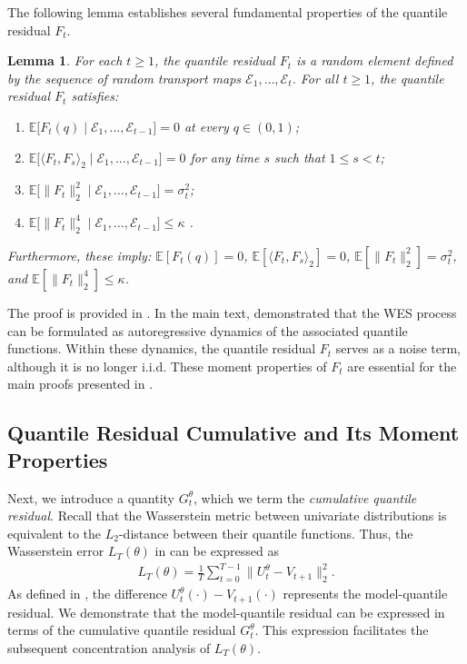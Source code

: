 \documentclass[a4paper, 11pt]{article}
\newcommand{\E}{\mathbb E}
\newcommand{\T}{\mathcal E}
\newtheorem{lemma}{Lemma}
\theoremstyle{definition}
\begin{document}
The following lemma establishes several fundamental properties of the quantile residual $F_{t}$.

\begin{lemma} \label{lem:residual_property}
	For each $t \ge 1$, the quantile residual $F_{t}$ is a random element defined by the sequence of random transport maps $\T_1, \dots, \T_{t}$.
	For all $t \ge 1$, the quantile residual $F_{t}$ satisfies:
	\begin{enumerate}
		\item $\E\big[ F_{t}(q) \mid \T_1, \dots, \T_{t-1} \big] = 0$ at every $q \in (0, 1)$;
		\item $\E\big[ \langle F_{t}, F_{s} \rangle_2 \mid \T_1, \dots, \T_{t-1} \big] = 0$ for any time $s$ such that $1 \le s < t$;
		\item $\E\big[ \| F_{t} \|_2^2 \mid \T_1, \dots, \T_{t-1} \big] = \sigma_{t}^2$;
		\item $\E\big[ \| F_{t} \|_2^4 \mid \T_1, \dots, \T_{t-1} \big] \le \kappa$ .
	\end{enumerate}
	Furthermore, these imply: $\E[ F_{t}(q) ] = 0$, $\E[ \langle F_{t}, F_{s} \rangle_2 ] = 0$, $\E[ \| F_{t} \|_2^2 ] = \sigma_{t}^2$, and $\E[ \| F_{t} \|_2^4 ] \le \kappa$.
\end{lemma}

The proof is provided in .
In the main text,  demonstrated that the WES process can be formulated as autoregressive dynamics of the associated quantile functions.
Within these dynamics, the quantile residual $F_t$ serves as a noise term, although it is no longer i.i.d.
These moment properties of $F_t$ are essential for the main proofs presented in .


\subsection{Quantile Residual Cumulative and Its Moment Properties} \label{apx:error_decomposition}

Next, we introduce a quantity $G_t^\theta$, which we term the \emph{cumulative quantile residual}.
Recall that the Wasserstein metric between univariate distributions is equivalent to the $L_2$-distance between their quantile functions.
Thus, the Wasserstein error $L_T(\theta)$ in  can be expressed as
\begin{align}
	L_T(\theta) = \frac{1}{T} \sum_{t=0}^{T-1} \| U_{t}^\theta - V_{t+1} \|_2^2 . \label{eq:W2_loss}
\end{align}
As defined in , the difference $U_{t}^\theta(\cdot) - V_{t+1}(\cdot)$ represents the model-quantile residual.
We demonstrate that the model-quantile residual can be expressed in terms of the cumulative quantile residual $G_t^\theta$.
This expression facilitates the subsequent concentration analysis of $L_T(\theta)$.
\end{document}
